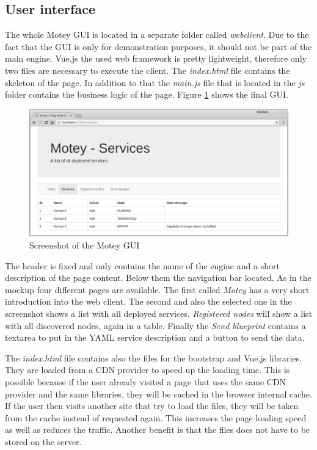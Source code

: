 \subsection{User interface}
The whole Motey \ac{GUI} is located in a separate folder called \textit{webclient}.
Due to the fact that the \ac{GUI} is only for demonstration purposes, it should not be part of the main engine.
Vue.js the used web framework is pretty lightweight, therefore only two files are necessary to execute the client.
The \textit{index.html} file contains the skeleton of the page.
In addition to that the \textit{main.js} file that is located in the \textit{js} folder contains the business logic of the page.
Figure \ref{fig:motey_gui_screenshot} shows the final \ac{GUI}.
\begin{figure}[H]
    \centering
    \includegraphics[width=\textwidth]{resources/images/motey_gui_screenshot.png}
    \caption[Screenshot of the Motey \ac{GUI}]{Screenshot of the Motey \ac{GUI}}
    \label{fig:motey_gui_screenshot}
\end{figure}
The header is fixed and only contains the name of the engine and a short description of the page content.
Below them the navigation bar located.
As in the mockup four different pages are available.
The first called \textit{Motey} has a very short introduction into the web client.
The second and also the selected one in the screenshot shows a list with all deployed services.
\textit{Registered nodes} will show a list with all discovered nodes, again in a table.
Finally the \textit{Send blueprint} contains a textarea to put in the \ac{YAML} service description and a button to send the data.

The \textit{index.html} file contains also the files for the bootstrap and Vue.js libraries.
They are loaded from a \ac{CDN} provider to speed up the loading time.
This is possible because if the user already visited a page that uses the same \ac{CDN} provider and the same libraries, they will be cached in the browser internal cache.
If the user then visits another site that try to load the files, they will be taken from the cache instead of requested again.
This increases the page loading speed as well as reduces the traffic.
Another benefit is that the files does not have to be stored on the server.

